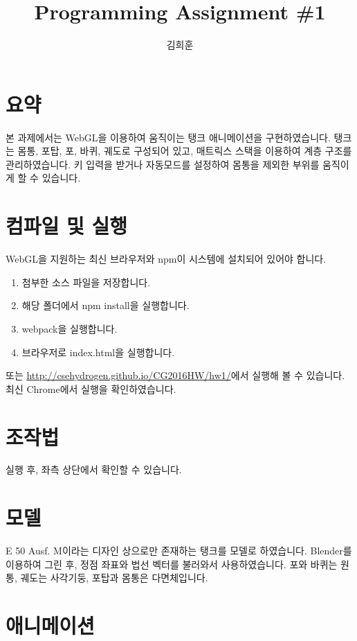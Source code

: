 \documentclass[12pt]{article}
\begin{document}
\title{Programming Assignment \#1}
\author{김희훈}
\maketitle

\section{요약}

본 과제에서는 WebGL을 이용하여 움직이는 탱크 애니메이션을 구현하였습니다. 탱크는
몸통, 포탑, 포, 바퀴, 궤도로 구성되어 있고, 매트릭스 스택을 이용하여 계층 구조를
관리하였습니다. 키 입력을 받거나 자동모드를 설정하여 몸통을 제외한 부위를
움직이게 할 수 있습니다.

\section{컴파일 및 실행}

WebGL을 지원하는 최신 브라우저와 npm이 시스템에 설치되어 있어야 합니다.

\begin{enumerate}
  \item 첨부한 소스 파일을 저장합니다.
  \item 해당 폴더에서 npm install을 실행합니다.
  \item webpack을 실행합니다.
  \item 브라우저로 index.html을 실행합니다.
\end{enumerate}

또는 \url{http://csehydrogen.github.io/CG2016HW/hw1/}에서 실행해 볼 수 있습니다.
최신 Chrome에서 실행을 확인하였습니다.

\section{조작법}

실행 후, 좌측 상단에서 확인할 수 있습니다.

\section{모델}

E 50 Ausf. M이라는 디자인 상으로만 존재하는 탱크를 모델로 하였습니다. Blender를
이용하여 그린 후, 정점 좌표와 법선 벡터를 불러와서 사용하였습니다. 포와 바퀴는
원통, 궤도는 사각기둥, 포탑과 몸통은 다면체입니다.

\section{애니메이션}
\end{document}
